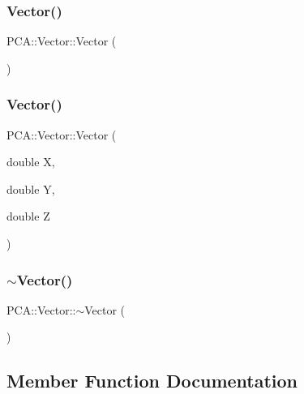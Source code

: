 \subsubsection{\texorpdfstring{Vector()}{Vector()}\hspace{0.1cm}{\footnotesize\ttfamily [1/2]}}
{\footnotesize\ttfamily P\+C\+A\+::\+Vector\+::\+Vector (\begin{DoxyParamCaption}{ }\end{DoxyParamCaption})}

\hypertarget{class_p_c_a_1_1_vector_aecc7fa6dbaffa3815fd23e4d8202c9b1}{}\label{class_p_c_a_1_1_vector_aecc7fa6dbaffa3815fd23e4d8202c9b1} 
\subsubsection{\texorpdfstring{Vector()}{Vector()}\hspace{0.1cm}{\footnotesize\ttfamily [2/2]}}
{\footnotesize\ttfamily P\+C\+A\+::\+Vector\+::\+Vector (\begin{DoxyParamCaption}\item[{double}]{X,  }\item[{double}]{Y,  }\item[{double}]{Z }\end{DoxyParamCaption})}

\hypertarget{class_p_c_a_1_1_vector_a3119a6ed9ccd0d7ac61bdfcbc9b7f1d3}{}\label{class_p_c_a_1_1_vector_a3119a6ed9ccd0d7ac61bdfcbc9b7f1d3} 
\subsubsection{\texorpdfstring{$\sim$\+Vector()}{~Vector()}}
{\footnotesize\ttfamily P\+C\+A\+::\+Vector\+::$\sim$\+Vector (\begin{DoxyParamCaption}{ }\end{DoxyParamCaption})}



\subsection{Member Function Documentation}
\hypertarget{class_p_c_a_1_1_vector_a865b60bf89b1dbf3165b8cc503dce2ca}{}\label{class_p_c_a_1_1_vector_a865b60bf89b1dbf3165b8cc503dce2ca} 
